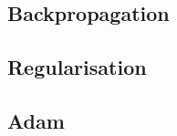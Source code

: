\begin{figure}
	
	
\end{figure}

\subsection{Backpropagation}
\subsection{Regularisation}
\label{early_stopping}
\subsection{Adam}